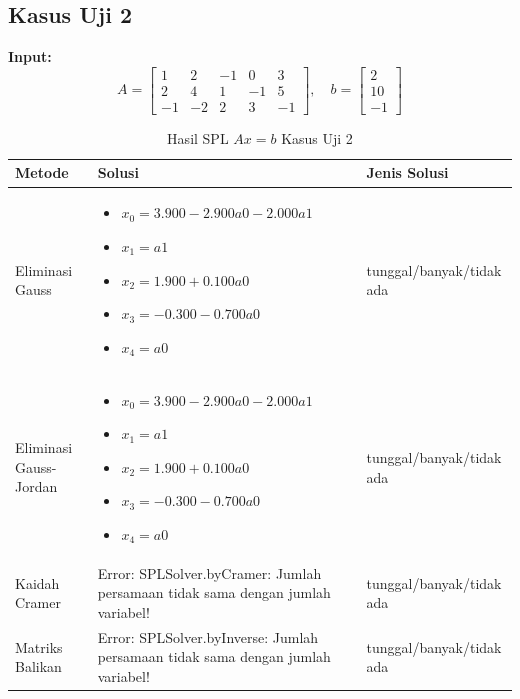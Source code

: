 \documentclass[12pt,a4paper]{report}
\begin{document}
\subsection{Kasus Uji 2}
\textbf{Input:}
\[
A = \begin{bmatrix} 1 & 2 & -1 & 0 & 3 \\ 2 & 4 & 1 & -1 & 5 \\ -1 & -2 & 2 & 3 & -1\end{bmatrix},
\quad
b = \begin{bmatrix}  2 \\ 10 \\ -1\end{bmatrix}
\]
 
\begin{table}[H]
    \centering
    \caption{Hasil SPL $Ax=b$ Kasus Uji 2}
    \begin{tabular}{|l|p{5cm}|l|}
        \hline
        \textbf{Metode} & \textbf{Solusi} & \textbf{Jenis Solusi} \\
        \hline
        Eliminasi Gauss & 
        \begin{itemize}
            \item $x_0 = 3.900 - 2.900a0 - 2.000a1$
            \item $x_1 = a1$
            \item $x_2 = 1.900 + 0.100a0$
            \item $x_3 = -0.300 - 0.700a0$
            \item $x_4 = a0$
        \end{itemize}
        & tunggal/banyak/tidak ada \\
        \hline
        Eliminasi Gauss-Jordan & 
        \begin{itemize}
            \item $x_0 = 3.900 - 2.900a0 - 2.000a1$
            \item $x_1 = a1$
            \item $x_2 = 1.900 + 0.100a0$
            \item $x_3 = -0.300 - 0.700a0$
            \item $x_4 = a0$
        \end{itemize}
        & tunggal/banyak/tidak ada \\
        \hline
        Kaidah Cramer & 
        Error: SPLSolver.byCramer: Jumlah persamaan tidak sama dengan jumlah variabel!
        & tunggal/banyak/tidak ada \\
        \hline
        Matriks Balikan & 
        Error: SPLSolver.byInverse: Jumlah persamaan tidak sama dengan jumlah variabel!
        & tunggal/banyak/tidak ada \\
        \hline
    \end{tabular}
\end{table}
 
\end{document}
